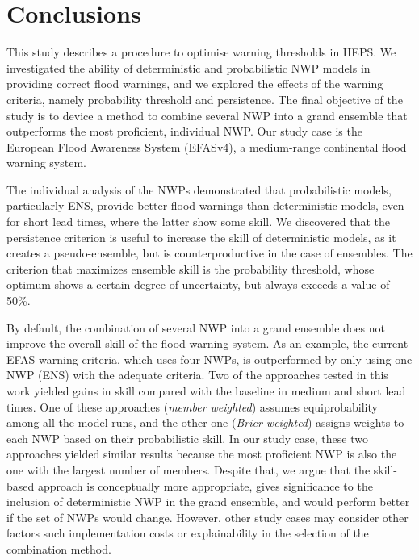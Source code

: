 \documentclass{ametsocV6.1}
\begin{document}
\section{Conclusions}
\label{sec:conclusions}

This study describes a procedure to optimise warning thresholds in HEPS. We investigated the ability of deterministic and probabilistic NWP models in providing correct flood warnings, and we explored the effects of the warning criteria, namely probability threshold and persistence. The final objective of the study is to device a method to combine several NWP into a grand ensemble that outperforms the most proficient, individual NWP. Our study case is the European Flood Awareness System (EFASv4), a medium-range continental flood warning system.

The individual analysis of the NWPs demonstrated that probabilistic models, particularly ENS, provide better flood warnings than deterministic models, even for short lead times, where the latter show some skill. We discovered that the persistence criterion is useful to increase the skill of deterministic models, as it creates a pseudo-ensemble, but is counterproductive in the case of ensembles. The criterion that maximizes ensemble skill is the probability threshold, whose optimum shows a certain degree of uncertainty, but always exceeds a value of 50\%.

By default, the combination of several NWP into a grand ensemble does not improve the overall skill of the flood warning system. As an example, the current EFAS warning criteria, which uses four NWPs, is outperformed by only using one NWP (ENS) with the adequate criteria. Two of the approaches tested in this work yielded gains in skill compared with the baseline in medium and short lead times. One of these approaches (\textit{member weighted}) assumes equiprobability among all the model runs, and the other one (\textit{Brier weighted}) assigns weights to each NWP based on their probabilistic skill. In our study case, these two approaches yielded similar results because the most proficient NWP is also the one with the largest number of members. Despite that, we argue that the skill-based approach is conceptually more appropriate, gives significance to the inclusion of deterministic NWP in the grand ensemble, and would perform better if the set of NWPs would change. However, other study cases may consider other factors such implementation costs or explainability in the selection of the combination method.
\end{document}

